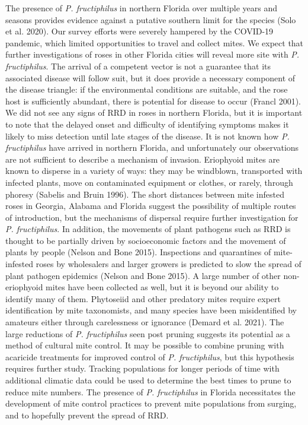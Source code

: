 \documentclass[12pt,final,CPage]{ufthesis}
\begin{document}
{  The presence of \emph{P. fructiphilus} in northern Florida over multiple years and seasons provides evidence against a putative southern limit for the species (Solo et al. 2020). Our survey efforts were severely hampered by the COVID-19 pandemic, which limited opportunities to travel and collect mites. We expect that further investigations of roses in other Florida cities will reveal more site with \emph{P. fructiphilus}. The arrival of a competent vector is not a guarantee that its associated disease will follow suit, but it does provide a necessary component of the disease triangle: if the environmental conditions are suitable, and the rose host is sufficiently abundant, there is potential for disease to occur (Francl 2001). We did not see any signs of RRD in roses in northern Florida, but it is important to note that the delayed onset and difficulty of identifying symptoms makes it likely to miss detection until late stages of the disease. It is not known how \emph{P. fructiphilus} have arrived in northern Florida, and unfortunately our observations are not sufficient to describe a mechanism of invasion. Eriophyoid mites are known to disperse in a variety of ways: they may be windblown, transported with infected plants, move on contaminated equipment or clothes, or rarely, through phoresy (Sabelis and Bruin 1996). The short distances between mite infested roses in Georgia, Alabama and Florida suggest the possibility of multiple routes of introduction, but the mechanisms of dispersal require further investigation for \emph{P. fructiphilus}. In addition, the movements of plant pathogens such as RRD is thought to be partially driven by socioeconomic factors and the movement of plants by people (Nelson and Bone 2015). Inspections and quarantines of mite-infested roses by wholesalers and larger growers is predicted to slow the spread of plant pathogen epidemics (Nelson and Bone 2015). A large number of other non-eriophyoid mites have been collected as well, but it is beyond our ability to identify many of them. Phytoseiid and other predatory mites require expert identification by mite taxonomists, and many species have been misidentified by amateurs either through carelessness or ignorance (Demard et al. 2021). The large reductions of \emph{P. fructiphilus} seen post pruning suggests its potential as a method of cultural mite control. It may be possible to combine pruning with acaricide treatments for improved control of \emph{P. fructiphilus}, but this hypothesis requires further study. Tracking populations for longer periods of time with additional climatic data could be used to determine the best times to prune to reduce mite numbers. The presence of \emph{P. fructiphilus} in Florida necessitates the development of mite control practices to prevent mite populations from surging, and to hopefully prevent the spread of RRD.

}
\end{document}
